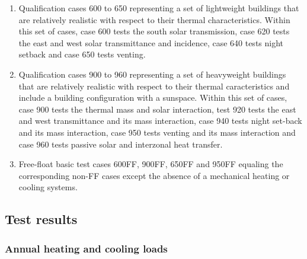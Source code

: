 \begin{enumerate}
\item Qualification cases 600 to 650 representing a set of lightweight buildings that are relatively realistic with respect to their thermal characteristics. Within this set of cases, case 600 tests the south solar transmission, case 620 tests the east and west solar transmittance and incidence, case 640 tests night setback and case 650 tests venting.
\item Qualification cases 900 to 960 representing a set of heavyweight buildings that are relatively realistic with respect to their thermal caracteristics and include a building configuration with a sunspace. Within this set of cases, case 900 tests the thermal mass and solar interaction, test 920 tests the east and west transmittance and its mass interaction, case 940 tests night set-back and its mass interaction, case 950 tests venting and its mass interaction and case 960 tests passive solar and interzonal heat transfer.
\item Free-float basic test cases 600FF, 900FF, 650FF and 950FF equaling the corresponding non-FF cases except the absence of a mechanical heating or cooling systems.
\end{enumerate}


\subsection{Test results}

\subsubsection{Annual heating and cooling loads}

